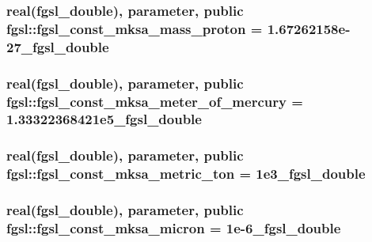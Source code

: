 \hypertarget{classfgsl_a9b4432f549e95747550b45df3417757f}{
\subsubsection[{fgsl\-\_\-const\-\_\-mksa\-\_\-mass\-\_\-proton}]{\setlength{\rightskip}{0pt plus 5cm}real({\bf fgsl\-\_\-double}), parameter, public fgsl\-::fgsl\-\_\-const\-\_\-mksa\-\_\-mass\-\_\-proton = 1.\-67262158e-\/27\-\_\-fgsl\-\_\-double}}\label{classfgsl_a9b4432f549e95747550b45df3417757f}
\hypertarget{classfgsl_a7f5943b971d1e27da66ed35eb36865a0}{
\subsubsection[{fgsl\-\_\-const\-\_\-mksa\-\_\-meter\-\_\-of\-\_\-mercury}]{\setlength{\rightskip}{0pt plus 5cm}real({\bf fgsl\-\_\-double}), parameter, public fgsl\-::fgsl\-\_\-const\-\_\-mksa\-\_\-meter\-\_\-of\-\_\-mercury = 1.\-33322368421e5\-\_\-fgsl\-\_\-double}}\label{classfgsl_a7f5943b971d1e27da66ed35eb36865a0}
\hypertarget{classfgsl_a0d771fd3ef9d093957328b9555c6a604}{
\subsubsection[{fgsl\-\_\-const\-\_\-mksa\-\_\-metric\-\_\-ton}]{\setlength{\rightskip}{0pt plus 5cm}real({\bf fgsl\-\_\-double}), parameter, public fgsl\-::fgsl\-\_\-const\-\_\-mksa\-\_\-metric\-\_\-ton = 1e3\-\_\-fgsl\-\_\-double}}\label{classfgsl_a0d771fd3ef9d093957328b9555c6a604}
\hypertarget{classfgsl_ab0be2229dca10e5128f21a8729ff742b}{
\subsubsection[{fgsl\-\_\-const\-\_\-mksa\-\_\-micron}]{\setlength{\rightskip}{0pt plus 5cm}real({\bf fgsl\-\_\-double}), parameter, public fgsl\-::fgsl\-\_\-const\-\_\-mksa\-\_\-micron = 1e-\/6\-\_\-fgsl\-\_\-double}}\label{classfgsl_ab0be2229dca10e5128f21a8729ff742b}
